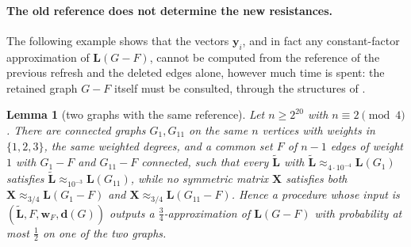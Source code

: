 \documentclass[11pt]{article}
\newtheorem{lemma}[theorem]{Lemma}
\theoremstyle{remark}
\newcommand{\dd}{\mathbf d}
\newcommand{\LL}{\mathbf L}
\newcommand{\LLtil}{{\widetilde{\LL}}}
\newcommand{\ww}{\mathbf w}
\newcommand{\XX}{\mathbf X}
\newcommand{\yy}{\mathbf y}
\begin{document}
\paragraph{The old reference does not determine the new resistances.}
The following example shows that the vectors $\yy_i$, and in fact any
constant-factor approximation of $\LL(G-F)$, cannot be computed from the
reference of the previous refresh and the deleted edges alone, however much
time is spent: the retained graph $G-F$ itself must be consulted, through
the structures of .
\begin{lemma}[two graphs with the same reference]\label{lem:twographs}
Let $n\ge2^{20}$ with $n\equiv2\pmod4$.
There are connected graphs $G_1,G_{11}$ on the same $n$ vertices with weights
in $\{1,2,3\}$, the same weighted degrees, and a common set $F$ of $n-1$ edges
of weight $1$ with $G_1-F$ and $G_{11}-F$ connected, such that every $\LLtil$
with $\LLtil\approx_{4\cdot10^{-4}}\LL(G_1)$ satisfies
$\LLtil\approx_{10^{-3}}\LL(G_{11})$, while no symmetric matrix $\XX$ satisfies
both $\XX\approx_{3/4}\LL(G_1-F)$ and $\XX\approx_{3/4}\LL(G_{11}-F)$.
Hence a procedure whose input is $(\LLtil,F,\ww_F,\dd(G))$ outputs a
$\frac34$-approximation of $\LL(G-F)$ with probability at most $\frac12$ on
one of the two graphs.
\end{lemma}
\end{document}
